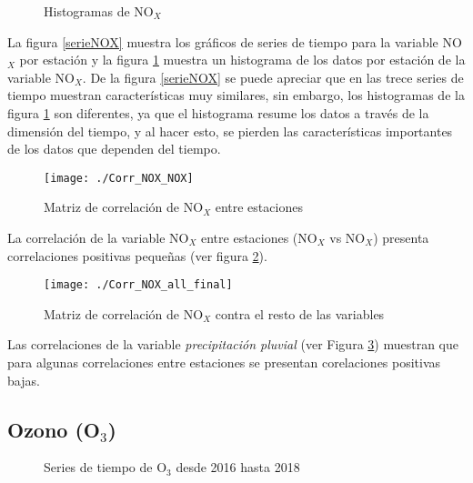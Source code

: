 \begin{figure}[H]
\centering
{}
\caption{Histogramas de NO$_{X}$}
\label{histNOX}
\end{figure}

La figura \ref{serieNOX} muestra los gráficos de series de tiempo para la variable NO$_{X}$ por estación y la figura \ref{histNOX} muestra un histograma de los datos por estación de la variable NO$_{X}$. De la figura \ref{serieNOX} se puede apreciar que en las trece series de tiempo muestran características muy similares, sin embargo, los histogramas de la figura \ref{histNOX} son diferentes, ya que el histograma resume los datos a través de la dimensión del tiempo, y al hacer esto, se pierden las características importantes de los datos que dependen del tiempo.

\begin{figure}[H]
\centering
\texttt{[image: ./Corr\_NOX\_NOX]}
\caption{Matriz de correlación de NO$_{X}$ entre estaciones }
\label{corrNOXNOX}
\end{figure}

La correlación de la variable NO$_{X}$ entre estaciones (NO$_{X}$ vs NO$_{X}$) presenta correlaciones positivas pequeñas (ver figura \ref{corrNOXNOX}).  

\begin{figure}[H]
\centering
\texttt{[image: ./Corr\_NOX\_all\_final]}
\caption{Matriz de correlación de NO$_{X}$  contra el resto de las variables}
\label{corrNOX}
\end{figure}

Las correlaciones de la variable {\em precipitación pluvial}  (ver Figura \ref{corrNOX}) muestran que para algunas correlaciones entre estaciones se presentan corelaciones positivas bajas.





\subsection{Ozono (O$_{3}$)}
\begin{figure}[H]
\centering
{}
\caption{Series de tiempo de O$_{3}$ desde 2016 hasta 2018}
\label{serieO3}
\end{figure}


